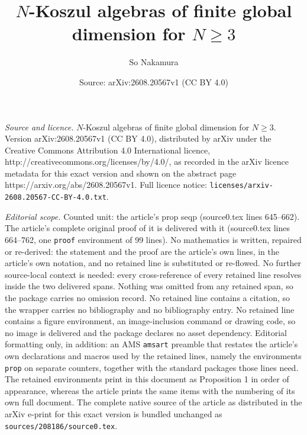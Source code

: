 \documentclass[10pt,a4paper]{amsart}
\title{$N$-Koszul algebras of finite global dimension for $N\geq 3$}
\author{So Nakamura}
\date{Source: arXiv:2608.20567v1 (CC BY 4.0)}
\begin{document}
\maketitle

\noindent\emph{Source and licence.} $N$-Koszul algebras of finite global dimension for $N\geq 3$. Version arXiv:2608.20567v1 (CC BY 4.0), distributed by arXiv under the Creative Commons Attribution 4.0 International licence, http://creativecommons.org/licenses/by/4.0/, as recorded in the arXiv licence metadata for this exact version and shown on the abstract page https://arxiv.org/abs/2608.20567v1. Full licence notice: \texttt{licenses/arxiv-2608.20567-CC-BY-4.0.txt}.\par\smallskip

\noindent\textit{Editorial scope.} Counted unit: the article's prop seqp (source0.tex lines 645--662). The article's complete original proof of it is delivered with it (source0.tex lines 664--762, one \texttt{proof} environment of 99 lines). No mathematics is written, repaired or re-derived: the statement and the proof are the article's own lines, in the article's own notation, and no retained line is substituted or re-flowed.  No further source-local context is needed: every cross-reference of every retained line resolves inside the two delivered spans.  Nothing was omitted from any retained span, so the package carries no omission record.  No retained line contains a citation, so the wrapper carries no bibliography and no bibliography entry.  No retained line contains a figure environment, an image-inclusion command or drawing code, so no image is delivered and the package declares no asset dependency.  Editorial formatting only, in addition: an AMS \texttt{amsart} preamble that restates the article's own declarations and macros used by the retained lines, namely the environments \texttt{prop} on separate counters, together with the standard packages those lines need.  The retained environments print in this document as Proposition 1 in order of appearance, whereas the article prints the same items with the numbering of its own full document.  The complete native source of the article as distributed in the arXiv e-print for this exact version is bundled unchanged as \texttt{sources/208186/source0.tex}.
\end{document}
